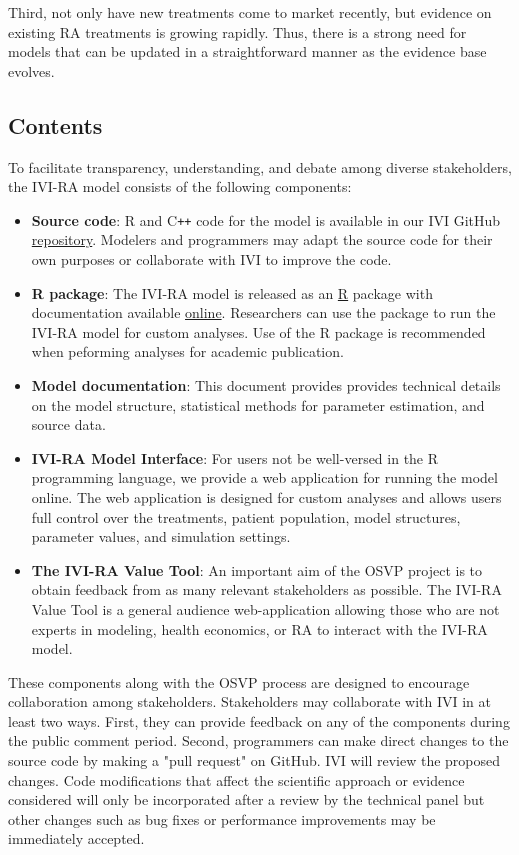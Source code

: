 \documentclass[11pt,final,fleqn]{article}
\theoremstyle{plain}
\newcommand\CPP{{C\texttt{++}}}
\newcommand\R{{\textsf{R}}}
\begin{document}
Third, not only have new treatments come to market recently, but evidence on existing RA treatments is growing rapidly. Thus, there is a strong need for models that can be updated in a straightforward manner as the evidence base evolves.

\subsection{Contents}\label{sec:contents}
To facilitate transparency, understanding, and debate among diverse stakeholders, the IVI-RA model consists of the following components:

\begin{itemize}
\item \textbf{Source code}: {\R{}} and \CPP{} code for the model is available in our IVI GitHub \href{https://github.com/InnovationValueInitiative/IVI-RA}{repository}. Modelers and programmers may adapt the source code for their own purposes or collaborate with IVI to improve the code.  
\item \textbf{{\R{}} package}: The IVI-RA model is released as an \href{https://cran.r-project.org/}{\R{}} package with documentation available \href{https://innovationvalueinitiative.github.io/IVI-RA/index.html}{online}. Researchers can use the package to run the IVI-RA model for custom analyses. Use of the {\R{}} package is recommended when peforming analyses for academic publication.
\item \textbf{Model documentation}: This document provides provides technical details on the model structure, statistical methods for parameter estimation, and source data.
\item \textbf{IVI-RA Model Interface}: For users not be well-versed in the {\R{}} programming language, we provide a web application for running the model online. The web application is designed for custom analyses and allows users full control over the treatments, patient population, model structures, parameter values, and simulation settings.  
\item \textbf{The IVI-RA Value Tool}: An important aim of the OSVP project is to obtain feedback from as many relevant stakeholders as possible. The IVI-RA Value Tool is a general audience web-application allowing those who are not experts in modeling, health economics, or RA to interact with the IVI-RA model. 
\end{itemize}

These components along with the OSVP process are designed to encourage collaboration among stakeholders. Stakeholders may collaborate with IVI in at least two ways. First, they can provide feedback on any of the components during the public comment period. Second, programmers can make direct changes to the source code by making a "pull request" on GitHub. IVI will review the proposed changes. Code modifications that affect the scientific approach or evidence considered will only be incorporated after a review by the technical panel but other changes such as bug fixes or performance improvements may be immediately accepted.
\end{document}
